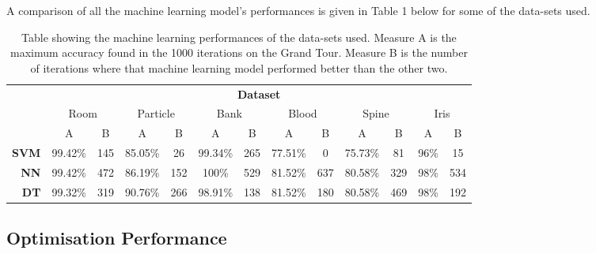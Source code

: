 \documentclass[a4paper,11pt,twoside]{article}
\begin{document}
A comparison of all the machine learning model's performances is given in Table 1 below for some of the data-sets used.

\begin{table}[h]
\caption{Table showing the machine learning performances of the data-sets used. Measure A is the maximum accuracy found in the 1000 iterations on the Grand Tour. Measure B is the number of iterations where that machine learning model performed better than the other two.}
\begin{tabular}{r|c|c|c|c|c|c|c|c|c|c|c|c|} 
\cline{2-13}

\multicolumn{1}{l|}{}              & \multicolumn{12}{c|}{\textbf{Dataset}}                                                                                                                                      \\ \cline{2-13} 
\multicolumn{1}{l|}{}              & \multicolumn{2}{c|}{Room} & \multicolumn{2}{c|}{Particle} & \multicolumn{2}{c|}{Bank} & \multicolumn{2}{c|}{Blood} & \multicolumn{2}{c|}{Spine} & \multicolumn{2}{c|}{Iris} \\ \cline{2-13} 
                                   & A             & B         & A               & B           & A             & B         & A              & B         & A              & B         & A            & B          \\ \hline
\multicolumn{1}{|r|}{\textbf{SVM}} & 99.42\%       & 145       & 85.05\%         & 26          & 99.34\%       & 265       & 77.51\%        & 0         & 75.73\%        & 81        & 96\%         & 15         \\ \hline
\multicolumn{1}{|r|}{\textbf{NN}}  & 99.42\%       & 472       & 86.19\%         & 152         & 100\%         & 529       & 81.52\%        & 637       & 80.58\%        & 329       & 98\%         & 534        \\ \hline
\multicolumn{1}{|r|}{\textbf{DT}}  & 99.32\%       & 319       & 90.76\%         & 266         & 98.91\%       & 138       & 81.52\%        & 180       & 80.58\%        & 469       & 98\%         & 192        \\ \hline

\end{tabular}

\end{table}

\subsection{Optimisation Performance}
\end{document}
